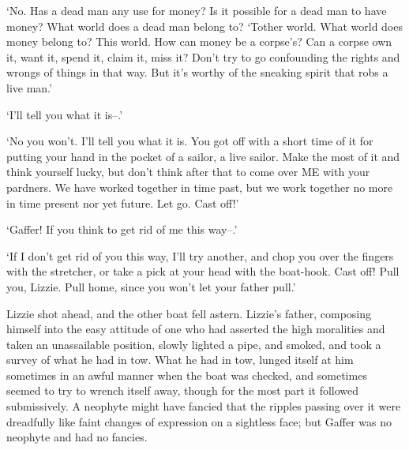 ‘No. Has a dead man any use for money? Is it possible for a dead man to
have money? What world does a dead man belong to? ‘Tother world. What
world does money belong to? This world. How can money be a corpse’s? Can
a corpse own it, want it, spend it, claim it, miss it? Don’t try to go
confounding the rights and wrongs of things in that way. But it’s worthy
of the sneaking spirit that robs a live man.’

‘I’ll tell you what it is--.’

‘No you won’t. I’ll tell you what it is. You got off with a short time
of it for putting your hand in the pocket of a sailor, a live sailor.
Make the most of it and think yourself lucky, but don’t think after
that to come over ME with your pardners. We have worked together in time
past, but we work together no more in time present nor yet future. Let
go. Cast off!’

‘Gaffer! If you think to get rid of me this way--.’

‘If I don’t get rid of you this way, I’ll try another, and chop you over
the fingers with the stretcher, or take a pick at your head with the
boat-hook. Cast off! Pull you, Lizzie. Pull home, since you won’t let
your father pull.’

Lizzie shot ahead, and the other boat fell astern. Lizzie’s father,
composing himself into the easy attitude of one who had asserted the
high moralities and taken an unassailable position, slowly lighted a
pipe, and smoked, and took a survey of what he had in tow. What he had
in tow, lunged itself at him sometimes in an awful manner when the boat
was checked, and sometimes seemed to try to wrench itself away, though
for the most part it followed submissively. A neophyte might have
fancied that the ripples passing over it were dreadfully like faint
changes of expression on a sightless face; but Gaffer was no neophyte
and had no fancies.

